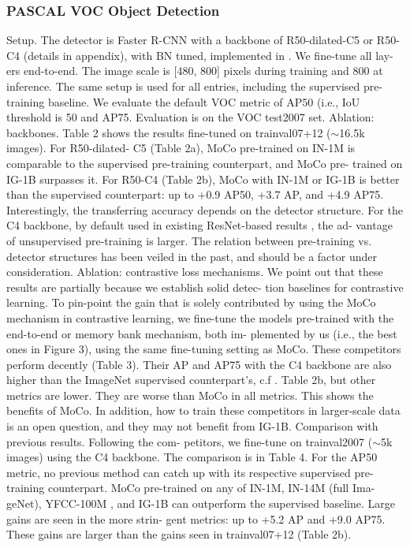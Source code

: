 \documentclass[10pt,twocolumn]{article}  %
\begin{document}
\subsubsection{PASCAL VOC Object Detection}
Setup. The detector is Faster R-CNN \cite{52_ren2015faster} with a backbone
of R50-dilated-C5 or R50-C4 \cite{32_he2017mask} (details in appendix),
with BN tuned, implemented in \cite{60_wu2019detectron2}. We ﬁne-tune all lay-
ers end-to-end. The image scale is [480, 800] pixels during
training and 800 at inference. The same setup is used for all
entries, including the supervised pre-training baseline. We
evaluate the default VOC metric of AP50 (i.e., IoU threshold
is 50%
and AP75. Evaluation is on the VOC test2007 set.
Ablation: backbones. Table 2 shows the results ﬁne-tuned
on trainval07+12 ($\sim $16.5k images). For R50-dilated-
C5 (Table 2a), MoCo pre-trained on IN-1M is comparable
to the supervised pre-training counterpart, and MoCo pre-
trained on IG-1B surpasses it. For R50-C4 (Table 2b),
MoCo with IN-1M or IG-1B is better than the supervised
counterpart: up to +0.9 AP50, +3.7 AP, and +4.9 AP75.
Interestingly, the transferring accuracy depends on the
detector structure. For the C4 backbone, by default used
in existing ResNet-based results \cite{14_doersch2017multi, 61_wu2018unsupervised, 26_goyal2019scaling, 66_zhuang2019local}, the ad-
vantage of unsupervised pre-training is larger. The relation
between pre-training vs. detector structures has been veiled
in the past, and should be a factor under consideration.
Ablation: contrastive loss mechanisms. We point out that
these results are partially because we establish solid detec-
tion baselines for contrastive learning. To pin-point the gain
that is solely contributed by using the MoCo mechanism
in contrastive learning, we ﬁne-tune the models pre-trained
with the end-to-end or memory bank mechanism, both im-
plemented by us (i.e., the best ones in Figure 3), using the
same ﬁne-tuning setting as MoCo.
These competitors perform decently (Table 3). Their AP
and AP75 with the C4 backbone are also higher than the
ImageNet supervised counterpart's, c.f . Table 2b, but other
metrics are lower. They are worse than MoCo in all metrics.
This shows the beneﬁts of MoCo. In addition, how to train
these competitors in larger-scale data is an open question,
and they may not beneﬁt from IG-1B.
Comparison with previous results. Following the com-
petitors, we ﬁne-tune on trainval2007 ($\sim $5k images)
using the C4 backbone. The comparison is in Table 4.
For the AP50 metric, no previous method can catch
up with its respective supervised pre-training counterpart.
MoCo pre-trained on any of IN-1M, IN-14M (full Ima-
geNet), YFCC-100M \cite{55_thomee2016yfcc100m}, and IG-1B can outperform the
supervised baseline. Large gains are seen in the more strin-
gent metrics: up to +5.2 AP and +9.0 AP75. These gains are
larger than the gains seen in trainval07+12 (Table 2b).
\end{document}
